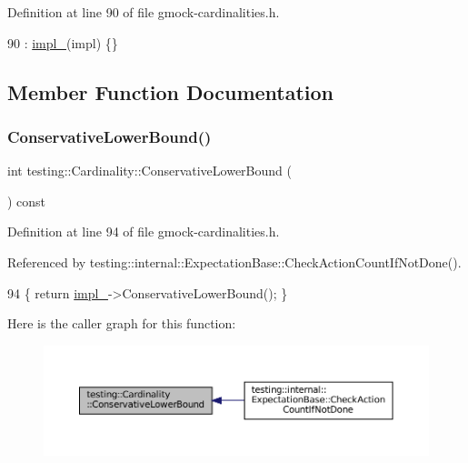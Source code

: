 Definition at line 90 of file gmock-\/cardinalities.\+h.


\begin{DoxyCode}
90 : \hyperlink{classtesting_1_1Cardinality_ae8c43c635af16756d535b491ccf19c2f}{impl\_}(impl) \{\}
\end{DoxyCode}


\subsection{Member Function Documentation}
\mbox{\label{classtesting_1_1Cardinality_ac1785ee5c466c2524f36b9ffb5f46c79}} 
\subsubsection{\texorpdfstring{Conservative\+Lower\+Bound()}{ConservativeLowerBound()}}
{\footnotesize\ttfamily int testing\+::\+Cardinality\+::\+Conservative\+Lower\+Bound (\begin{DoxyParamCaption}{ }\end{DoxyParamCaption}) const\hspace{0.3cm}{\ttfamily [inline]}}



Definition at line 94 of file gmock-\/cardinalities.\+h.



Referenced by testing\+::internal\+::\+Expectation\+Base\+::\+Check\+Action\+Count\+If\+Not\+Done().


\begin{DoxyCode}
94 \{ \textcolor{keywordflow}{return} \hyperlink{classtesting_1_1Cardinality_ae8c43c635af16756d535b491ccf19c2f}{impl\_}->ConservativeLowerBound(); \}
\end{DoxyCode}
Here is the caller graph for this function\+:
\nopagebreak
\begin{figure}[H]
\begin{center}
\leavevmode
\includegraphics[width=350pt]{classtesting_1_1Cardinality_ac1785ee5c466c2524f36b9ffb5f46c79_icgraph}
\end{center}
\end{figure}
\mbox{\label{classtesting_1_1Cardinality_acb42e3683f99b986f3ac538b5eefbc31}} 
